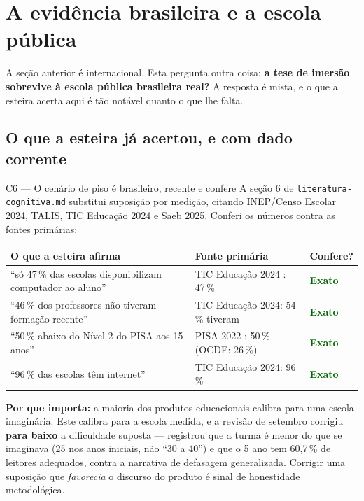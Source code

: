 \documentclass[11pt,a4paper]{article}
\begin{document}
\section{A evid\^encia brasileira e a escola p\'ublica}
\label{sec:brasil}

A se\c{c}\~ao anterior \'e internacional. Esta pergunta outra coisa: \textbf{a tese de imers\~ao
sobrevive \`a escola p\'ublica brasileira real?} A resposta \'e mista, e o que a esteira acerta
aqui \'e t\~ao not\'avel quanto o que lhe falta.

\subsection{O que a esteira j\'a acertou, e com dado corrente}

\begin{creditobox}{C6 --- O cen\'ario de piso \'e brasileiro, recente e confere}
A se\c{c}\~ao 6 de \texttt{literatura-cognitiva.md} substitui suposi\c{c}\~ao por medi\c{c}\~ao,
citando INEP/Censo Escolar 2024, TALIS, TIC Educa\c{c}\~ao 2024 e Saeb 2025. Conferi os n\'umeros
contra as fontes prim\'arias:

\begin{center}\small
\begin{tabular}{@{}p{5.6cm} p{4.2cm} p{5.0cm}@{}}
\toprule
\textbf{O que a esteira afirma} & \textbf{Fonte prim\'aria} & \textbf{Confere?} \\
\midrule
``s\'o 47\,\% das escolas disponibilizam computador ao aluno'' &
TIC Educa\c{c}\~ao 2024 \cite{ticedu2024}: 47\,\% &
\textcolor{DarkGreen}{\textbf{Exato}} \\
``46\,\% dos professores n\~ao tiveram forma\c{c}\~ao recente'' &
TIC Educa\c{c}\~ao 2024: 54\,\% tiveram &
\textcolor{DarkGreen}{\textbf{Exato}} \\
``50\,\% abaixo do N\'ivel 2 do PISA aos 15 anos'' &
PISA 2022 \cite{pisa2022}: 50\,\% (OCDE: 26\,\%) &
\textcolor{DarkGreen}{\textbf{Exato}} \\
``96\,\% das escolas t\^em internet'' &
TIC Educa\c{c}\~ao 2024: 96\,\% &
\textcolor{DarkGreen}{\textbf{Exato}} \\
\bottomrule
\end{tabular}
\end{center}

\textbf{Por que importa:} a maioria dos produtos educacionais calibra para uma escola imagin\'aria.
Este calibra para a escola medida, e a revis\~ao de setembro corrigiu \textbf{para baixo} a
dificuldade suposta --- registrou que a turma \'e menor do que se imaginava (25 nos anos iniciais,
n\~ao ``30 a 40'') e que o 5\textordmasculine{} ano tem 60,7\,\% de leitores adequados, contra a
narrativa de defasagem generalizada. Corrigir uma suposi\c{c}\~ao que \emph{favorecia} o discurso
do produto \'e sinal de honestidade metodol\'ogica.
\end{creditobox}
\end{document}
